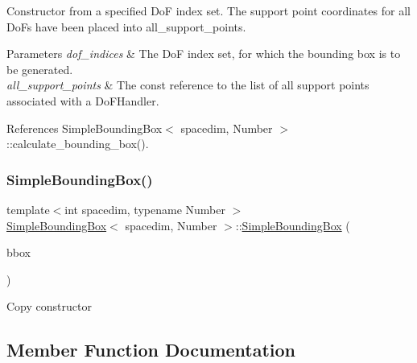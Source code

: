 Constructor from a specified DoF index set. The support point coordinates for all Do\+Fs have been placed into {\ttfamily all\+\_\+support\+\_\+points}. 
\begin{DoxyParams}{Parameters}
{\em dof\+\_\+indices} & The DoF index set, for which the bounding box is to be generated. \\
\hline
{\em all\+\_\+support\+\_\+points} & The const reference to the list of all support points associated with a Do\+F\+Handler. \\
\hline
\end{DoxyParams}


References Simple\+Bounding\+Box$<$ spacedim, Number $>$\+::calculate\+\_\+bounding\+\_\+box().

\mbox{\label{classSimpleBoundingBox_adb50933d0b5a524cfa98f79fd231d557}} 
\subsubsection{\texorpdfstring{Simple\+Bounding\+Box()}{SimpleBoundingBox()}\hspace{0.1cm}{\footnotesize\ttfamily [7/7]}}
{\footnotesize\ttfamily template$<$int spacedim, typename Number $>$ \\
\hyperlink{classSimpleBoundingBox}{Simple\+Bounding\+Box}$<$ spacedim, Number $>$\+::\hyperlink{classSimpleBoundingBox}{Simple\+Bounding\+Box} (\begin{DoxyParamCaption}\item[{const \hyperlink{classSimpleBoundingBox}{Simple\+Bounding\+Box}$<$ spacedim, Number $>$ \&}]{bbox }\end{DoxyParamCaption})}

Copy constructor 

\subsection{Member Function Documentation}
\mbox{\label{classSimpleBoundingBox_a140e9c7c01b868cfe6a5288f69522bf4}} 
